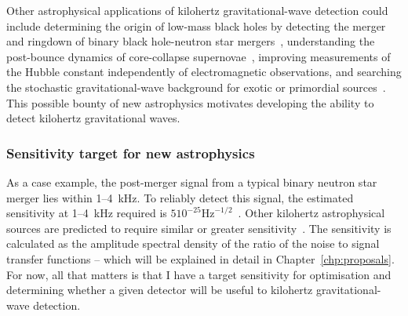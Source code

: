 Other astrophysical applications of kilohertz gravitational-wave detection could include determining the origin of low-mass black holes by detecting the merger and ringdown of binary black hole-neutron star mergers~\cite{}, understanding the post-bounce dynamics of core-collapse supernovae~\cite{}, improving measurements of the Hubble constant independently of electromagnetic observations, and searching the stochastic gravitational-wave background for exotic or primordial sources~\cite{miaoDesignGravitationalWaveDetectors2018}.
This possible bounty of new astrophysics motivates developing the ability to detect kilohertz gravitational waves.



\subsubsection{Sensitivity target for new astrophysics}

As a case example, the post-merger signal from a typical binary neutron star merger lies within 1--4~kHz. To reliably detect this signal, the estimated sensitivity at 1--4~kHz required is $5 10^{-25} \mathrm{Hz}^{-1/2}$~\cite{miaoDesignGravitationalWaveDetectors2018}. 
Other kilohertz astrophysical sources are predicted to require similar or greater sensitivity~\cite{}. 
The sensitivity is calculated as the amplitude spectral density of the ratio of the noise to signal transfer functions -- which will be explained in detail in Chapter~\ref{chp:proposals}. For now, all that matters is that I have a target sensitivity for optimisation and determining whether a given detector will be useful to kilohertz gravitational-wave detection.


